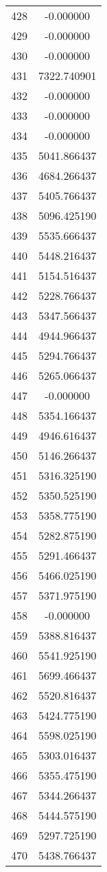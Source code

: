 \documentclass[12pt]{article}
\begin{document}
\begin{longtable}{@{}cc@{}}
428 & -0.000000 \\
429 & -0.000000 \\
430 & -0.000000 \\
431 & 7322.740901 \\
432 & -0.000000 \\
433 & -0.000000 \\
434 & -0.000000 \\
435 & 5041.866437 \\
436 & 4684.266437 \\
437 & 5405.766437 \\
438 & 5096.425190 \\
439 & 5535.666437 \\
440 & 5448.216437 \\
441 & 5154.516437 \\
442 & 5228.766437 \\
443 & 5347.566437 \\
444 & 4944.966437 \\
445 & 5294.766437 \\
446 & 5265.066437 \\
447 & -0.000000 \\
448 & 5354.166437 \\
449 & 4946.616437 \\
450 & 5146.266437 \\
451 & 5316.325190 \\
452 & 5350.525190 \\
453 & 5358.775190 \\
454 & 5282.875190 \\
455 & 5291.466437 \\
456 & 5466.025190 \\
457 & 5371.975190 \\
458 & -0.000000 \\
459 & 5388.816437 \\
460 & 5541.925190 \\
461 & 5699.466437 \\
462 & 5520.816437 \\
463 & 5424.775190 \\
464 & 5598.025190 \\
465 & 5303.016437 \\
466 & 5355.475190 \\
467 & 5344.266437 \\
468 & 5444.575190 \\
469 & 5297.725190 \\
470 & 5438.766437 \\

\end{longtable}
\end{document}
